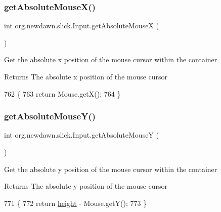 \subsubsection{\texorpdfstring{get\+Absolute\+Mouse\+X()}{getAbsoluteMouseX()}}
{\footnotesize\ttfamily int org.\+newdawn.\+slick.\+Input.\+get\+Absolute\+MouseX (\begin{DoxyParamCaption}{ }\end{DoxyParamCaption})\hspace{0.3cm}{\ttfamily [inline]}}

Get the absolute x position of the mouse cursor within the container

\begin{DoxyReturn}{Returns}
The absolute x position of the mouse cursor 
\end{DoxyReturn}

\begin{DoxyCode}
762                                    \{
763         \textcolor{keywordflow}{return} Mouse.getX();
764     \}
\end{DoxyCode}
\mbox{\label{classorg_1_1newdawn_1_1slick_1_1_input_a379e07a12261cad357a75537d576e812}} 
\subsubsection{\texorpdfstring{get\+Absolute\+Mouse\+Y()}{getAbsoluteMouseY()}}
{\footnotesize\ttfamily int org.\+newdawn.\+slick.\+Input.\+get\+Absolute\+MouseY (\begin{DoxyParamCaption}{ }\end{DoxyParamCaption})\hspace{0.3cm}{\ttfamily [inline]}}

Get the absolute y position of the mouse cursor within the container

\begin{DoxyReturn}{Returns}
The absolute y position of the mouse cursor 
\end{DoxyReturn}

\begin{DoxyCode}
771                                    \{
772         \textcolor{keywordflow}{return} \mbox{\hyperlink{classorg_1_1newdawn_1_1slick_1_1_input_a7d805ec6ad6944a4c48189e8435c3589}{height}} - Mouse.getY();
773     \}
\end{DoxyCode}
\mbox{\label{classorg_1_1newdawn_1_1slick_1_1_input_a9c3dde96ab6a064b02e7eb24fe29cc4a}} 
